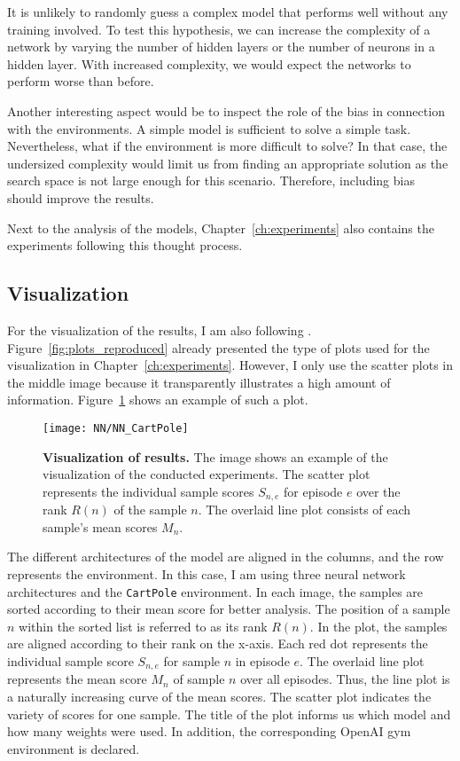 It is unlikely to randomly guess a complex model that performs well without any training involved. To test this hypothesis, we can increase the complexity of a network by varying the number of hidden layers or the number of neurons in a hidden layer. With increased complexity, we would expect the networks to perform worse than before.

Another interesting aspect would be to inspect the role of the bias in connection with the environments. A simple model is sufficient to solve a simple task. Nevertheless, what if the environment is more difficult to solve? In that case, the undersized complexity would limit us from finding an appropriate solution as the search space is not large enough for this scenario. Therefore, including bias should improve the results.

Next to the analysis of the models, Chapter~\ref{ch:experiments} also contains the experiments following this thought process.

\subsection{Visualization}
For the visualization of the results, I am also following \cite{oller_analyzing_2020}. Figure~\ref{fig:plots_reproduced} already presented the type of plots used for the visualization in Chapter~\ref{ch:experiments}. However, I only use the scatter plots in the middle image because it transparently illustrates a high amount of information. Figure~\ref{fig:visualization} shows an example of such a plot.
\begin{figure}[!ht]
  \centering
\texttt{[image: NN/NN\_CartPole]}
\caption[Visualization of results]{
  \textbf{Visualization of results.}
  The image shows an example of the visualization of the conducted experiments. The scatter plot represents the individual sample scores $S_{n,e}$ for episode $e$ over the rank $R(n)$ of the sample $n$. The overlaid line plot consists of each sample's mean scores $M_n$.
}
\label{fig:visualization}
\end{figure}
The different architectures of the model are aligned in the columns, and the row represents the environment. In this case, I am using three neural network architectures and the \verb|CartPole| environment. In each image, the samples are sorted according to their mean score for better analysis. The position of a sample $n$ within the sorted list is referred to as its rank $R(n)$. In the plot, the samples are aligned according to their rank on the x-axis. Each red dot represents the individual sample score $S_{n,e}$ for sample $n$ in episode $e$. The overlaid line plot represents the mean score $M_n$ of sample $n$ over all episodes. Thus, the line plot is a naturally increasing curve of the mean scores. The scatter plot indicates the variety of scores for one sample. The title of the plot informs us which model and how many weights were used. In addition, the corresponding OpenAI gym environment is declared.

